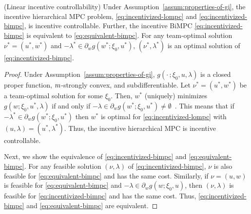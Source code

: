 \begin{theorem} (Linear incentive controllability)
\label{thm:bimpc-equivalence}
Under Assumption~\ref{assum:properties-of-gi}, the incentive hierarchical MPC problem, \eqref{eq:incentivized-lompc} and \eqref{eq:incentivized-bimpc}, is incentive controllable.
Further, the incentive BiMPC \eqref{eq:incentivized-bimpc} is equivalent to \eqref{eq:equivalent-bimpc}.
For any team-optimal solution $\nu^* = (u^*, w^*)$ and $-\lambda^* \in \partial_w g(w^*; \xi_0, u^*)$, $(\nu^*, \lambda^*)$ is an optimal solution of \eqref{eq:incentivized-bimpc}.
\end{theorem}

\begin{proof}
Under Assumption~\ref{assum:properties-of-gi}, $g(\cdot \,; \xi_0, u, \lambda)$ is a closed proper function, $m$-strongly convex, and subdifferentiable.
Let $\nu^*=(u^*,w^*)$ be a team-optimal solution for some $\xi_0$.
Then, $w^*$ (uniquely) minimizes $g(w; \xi_0, u^*, \lambda)$ if and only if $-\lambda \in \partial_w g(w^*; \xi_0, u^*) \neq \emptyset$~\cite[Thm.~23.5]{rockafellar1997convex}.
This means that if $-\lambda^* \in \partial_w g(w^*; \xi_0, u^*)$ then $w^*$ is optimal for \eqref{eq:incentivized-lompc} with $(u, \lambda) = (u^*, \lambda^*)$.
Thus, the incentive hierarchical MPC is incentive controllable.

Next, we show the equivalence of \eqref{eq:incentivized-bimpc} and \eqref{eq:equivalent-bimpc}.
For any feasible solution $(\nu, \lambda)$ of \eqref{eq:incentivized-bimpc}, $\nu$ is also feasible for \eqref{eq:equivalent-bimpc} and has the same cost.
Similarly, if $\nu=(u, w)$ is feasible for \eqref{eq:equivalent-bimpc} and $-\lambda \in \partial_w g(w; \xi_0, u)$, then $(\nu, \lambda)$ is feasible for \eqref{eq:incentivized-bimpc} and has the same cost.
Thus, \eqref{eq:incentivized-bimpc} and \eqref{eq:equivalent-bimpc} are equivalent.
\end{proof}

